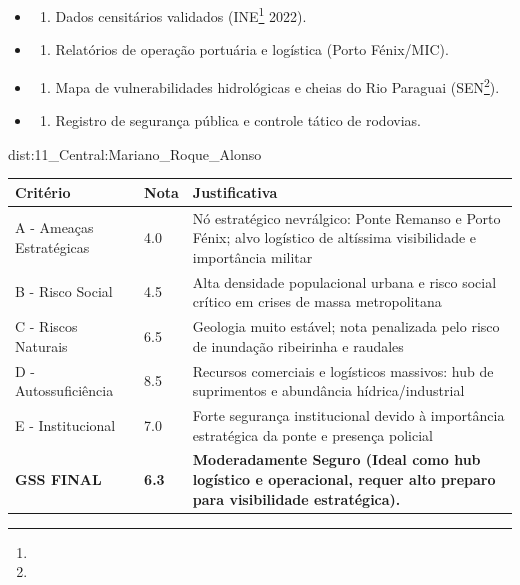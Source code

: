 {\begin{itemize}
\tightlist
\item
  \begin{enumerate}
  \def\labelenumi{\arabic{enumi})}
  \tightlist
  \item
    Dados censitários validados (INE\footnote{\fineINE} 2022).
  \end{enumerate}
\item
  \begin{enumerate}
  \def\labelenumi{\arabic{enumi})}
  \setcounter{enumi}{1}
  \tightlist
  \item
    Relatórios de operação portuária e logística (Porto Fénix/\allowbreak MIC).
  \end{enumerate}
\item
  \begin{enumerate}
  \def\labelenumi{\arabic{enumi})}
  \setcounter{enumi}{2}
  \tightlist
  \item
    Mapa de vulnerabilidades hidrológicas e cheias do Rio Paraguai
    (SEN\footnote{\fineSEN}).
  \end{enumerate}
\item
  \begin{enumerate}
  \def\labelenumi{\arabic{enumi})}
  \setcounter{enumi}{3}
  \tightlist
  \item
    Registro de segurança pública e controle tático de rodovias.
  \end{enumerate}
\end{itemize}}{dist:11_Central:Mariano_Roque_Alonso}
\begin{table}[ht!]
\small \begin{tabular}{p{3.0cm}p{0.8cm}p{6.0cm}} \toprule
\textbf{Critério} & \textbf{Nota} & \textbf{Justificativa} \\ \midrule
A - Ameaças Estratégicas & 4.0 & Nó estratégico nevrálgico: Ponte Remanso e Porto Fénix; alvo logístico de altíssima visibilidade e importância militar \\
B - Risco Social & 4.5 & Alta densidade populacional urbana e risco social crítico em crises de massa metropolitana \\
C - Riscos Naturais & 6.5 & Geologia muito estável; nota penalizada pelo risco de inundação ribeirinha e raudales \\
D - Autossuficiência & 8.5 & Recursos comerciais e logísticos massivos: hub de suprimentos e abundância hídrica/\allowbreak industrial \\
E - Institucional & 7.0 & Forte segurança institucional devido à importância estratégica da ponte e presença policial \\
\midrule \textbf{GSS FINAL} & \textbf{6.3} & \textbf{Moderadamente Seguro (Ideal como hub logístico e operacional, requer alto preparo para visibilidade estratégica).} \\ \bottomrule \end{tabular}
\end{table}
